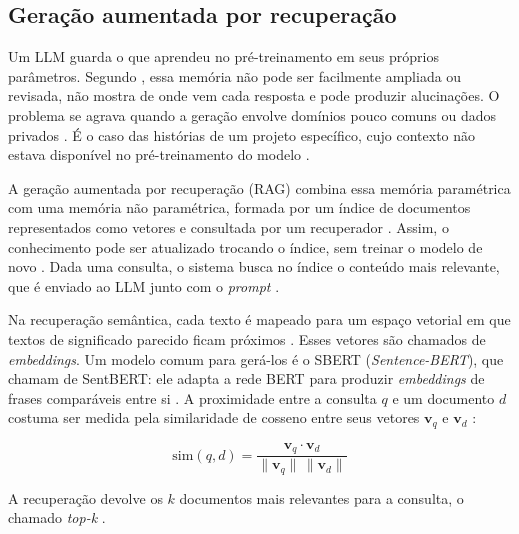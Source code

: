 \subsection{Geração aumentada por recuperação}
\label{sec:ref-rag}

Um LLM guarda o que aprendeu no pré-treinamento em seus próprios parâmetros. Segundo , essa memória não pode ser facilmente ampliada ou revisada, não mostra de onde vem cada resposta e pode produzir alucinações. O problema se agrava quando a geração envolve domínios pouco comuns ou dados privados \cite{ram2023}. É o caso das histórias de um projeto específico, cujo contexto não estava disponível no pré-treinamento do modelo \cite{wang2025}.

A geração aumentada por recuperação (RAG) combina essa memória paramétrica com uma memória não paramétrica, formada por um índice de documentos representados como vetores e consultada por um recuperador \cite{lewis2020}. Assim, o conhecimento pode ser atualizado trocando o índice, sem treinar o modelo de novo \cite{lewis2020}. Dada uma consulta, o sistema busca no índice o conteúdo mais relevante, que é enviado ao LLM junto com o \textit{prompt} \cite{wang2025}.

Na recuperação semântica, cada texto é mapeado para um espaço vetorial em que textos de significado parecido ficam próximos \cite{reimers2019}. Esses vetores são chamados de \textit{embeddings}. Um modelo comum para gerá-los é o SBERT (\textit{Sentence-BERT}), que  chamam de SentBERT: ele adapta a rede BERT para produzir \textit{embeddings} de frases comparáveis entre si \cite{reimers2019}. A proximidade entre a consulta $q$ e um documento $d$ costuma ser medida pela similaridade de cosseno entre seus vetores $\mathbf{v}_q$ e $\mathbf{v}_d$ \cite{ma2024}:

\begin{equation}
  \label{eq:cosseno}
  \mathrm{sim}(q, d) = \frac{\mathbf{v}_q \cdot \mathbf{v}_d}{\|\mathbf{v}_q\| \, \|\mathbf{v}_d\|}
\end{equation}

A recuperação devolve os $k$ documentos mais relevantes para a consulta, o chamado \textit{top-k} \cite{ma2024,wang2025}.

